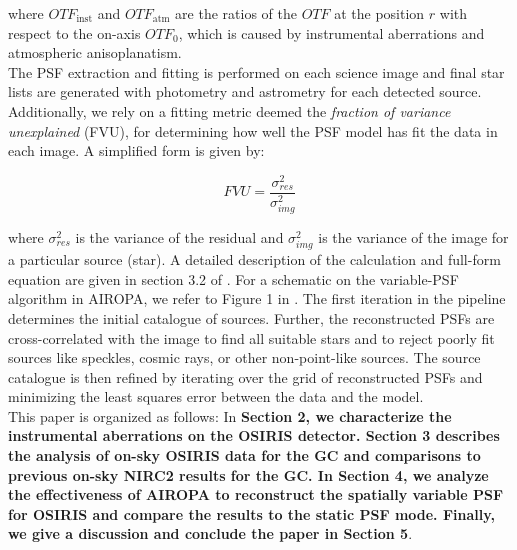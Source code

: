 \documentclass[]{spie}  %
\begin{document}
\noindent where $OTF_{\textrm{inst}}$ and $OTF_{\textrm{atm}}$ are the ratios of the $OTF$ at the position $r$ with respect to the on-axis $OTF_{0}$, which is caused by instrumental aberrations and atmospheric anisoplanatism.
\\
\indent The PSF extraction and fitting is performed on each science image and final star lists are generated with photometry and astrometry for each detected source. Additionally, we rely on a fitting metric deemed the \textit{fraction of variance unexplained} (FVU), for determining how well the PSF model has fit the data in each image. A simplified form is given by:

\begin{equation}
    FVU = \frac{\sigma^{2}_{res}}{\sigma^{2}_{img}}
\end{equation}

\noindent where $\sigma^{2}_{res}$ is the variance of the residual and $\sigma^{2}_{img}$ is the variance of the image for a particular source (star). A detailed description of the calculation and full-form equation are given in section 3.2 of \cite{Ciurlo:inprep}.
For a schematic on the variable-PSF algorithm in AIROPA, we refer to Figure 1 in \cite{turri:2022}. The first iteration in the pipeline determines the initial catalogue of sources. Further, the reconstructed PSFs are cross-correlated with the image to find all suitable stars and to reject poorly fit sources like speckles, cosmic rays, or other non-point-like sources. The source catalogue is then refined by iterating over the grid of reconstructed PSFs and minimizing the least squares error between the data and the model.
\\
\indent This paper is organized as follows: In \textbf{Section 2, we characterize the instrumental aberrations on the OSIRIS detector. Section 3 describes the analysis of on-sky OSIRIS data for the GC and comparisons to previous on-sky NIRC2 results for the GC. In Section 4, we analyze the effectiveness of AIROPA to reconstruct the spatially variable PSF for OSIRIS and compare the results to the static PSF mode. Finally, we give a discussion and conclude the paper in Section 5}.
\end{document}
